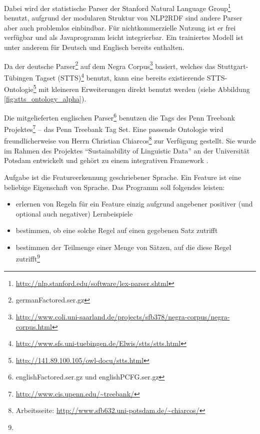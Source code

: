 Dabei wird der statistische Parser der Stanford Natural Language Group\footnote{\url{http://nlp.stanford.edu/software/lex-parser.shtml}} benutzt, aufgrund der modularen Struktur von NLP2RDF
sind andere Parser aber auch problemlos einbindbar.
Für nichtkommerzielle Nutzung ist er frei verfügbar und als Javaprogramm leicht integrierbar.
Ein trainiertes Modell ist unter anderem für Deutsch und Englisch bereits enthalten.

Da der deutsche Parser\footnote{germanFactored.ser.gz} auf dem Negra Corpus\footnote{\url{http://www.coli.uni-saarland.de/projects/sfb378/negra-corpus/negra-corpus.html}} basiert,
 welches das Stuttgart-Tübingen Tagset (STTS)\footnote{\url{http://www.sfs.uni-tuebingen.de/Elwis/stts/stts.html}} benutzt,
kann eine bereits existierende STTS-Ontologie\footnote{\url{http://141.89.100.105/owl-docu/stts.html}} mit kleineren Erweiterungen direkt benutzt werden (siehe Abbildung \ref{fig:stts_ontology_alpha}).

Die mitgelieferten englischen Parser\footnote{englishFactored.ser.gz und englishPCFG.ser.gz} benutzen die Tags des Penn Treebank Projektes\footnote{\url{http://www.cis.upenn.edu/~treebank/}} -- das Penn Treebank Tag Set.
Eine passende Ontologie wird freundlicherweise von Herrn Christian Chiarcos\footnote{Arbeitsseite: \url{http://www.sfb632.uni-potsdam.de/~chiarcos/}} zur Verfügung gestellt.
Sie wurde im Rahmen des Projektes “Sustainability of Linguistic Data” an der Universität Potsdam entwickelt und gehört zu einem integrativen Framework \citep{ontology-based_interface_specifications}.

\iffalse
%
Aufgabe ist die Featureerkennung geschriebener Sprache. Ein Feature ist eine beliebige Eigenschaft von Sprache.
Das Programm soll folgendes leisten:
\begin{itemize}
\item erlernen von Regeln für ein Feature einzig aufgrund angebener positiver (und optional auch negativer) Lernbeispiele
\item bestimmen, ob eine solche Regel auf einen gegebenen Satz zutrifft
\item bestimmen der Teilmenge einer Menge von Sätzen, auf die diese Regel zutrifft\footnote{}
\end{itemize}

